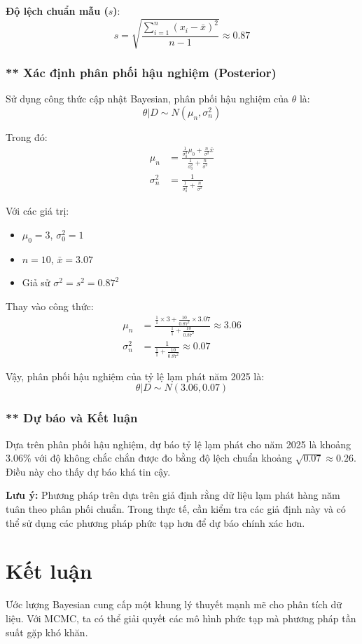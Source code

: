 \textbf{Độ lệch chuẩn mẫu ($s$)}:
\begin{equation}
    s = \sqrt{\frac{\sum_{i=1}^{n} (x_i - \bar{x})^2}{n-1}} \approx 0.87
\end{equation}

\subsubsection{** Xác định phân phối hậu nghiệm (Posterior)}
Sử dụng công thức cập nhật Bayesian, phân phối hậu nghiệm của $\theta$ là:
\begin{equation}
    \theta | D \sim N(\mu_n, \sigma_n^2)
\end{equation}

Trong đó:
\begin{align}
    \mu_n &= \frac{\frac{1}{\sigma_0^2} \mu_0 + \frac{n}{\sigma^2} \bar{x}}{\frac{1}{\sigma_0^2} + \frac{n}{\sigma^2}} \\
    \sigma_n^2 &= \frac{1}{\frac{1}{\sigma_0^2} + \frac{n}{\sigma^2}}
\end{align}

Với các giá trị:
\begin{itemize}
    \item $\mu_0 = 3$, $\sigma_0^2 = 1$
    \item $n = 10$, $\bar{x} = 3.07$
    \item Giả sử $\sigma^2 = s^2 = 0.87^2$
\end{itemize}

Thay vào công thức:
\begin{align}
    \mu_n &= \frac{\frac{1}{1} \times 3 + \frac{10}{0.87^2} \times 3.07}{\frac{1}{1} + \frac{10}{0.87^2}} \approx 3.06 \\
    \sigma_n^2 &= \frac{1}{\frac{1}{1} + \frac{10}{0.87^2}} \approx 0.07
\end{align}

Vậy, phân phối hậu nghiệm của tỷ lệ lạm phát năm 2025 là:
\begin{equation}
    \theta | D \sim N(3.06, 0.07)
\end{equation}

\subsubsection{** Dự báo và Kết luận}
Dựa trên phân phối hậu nghiệm, dự báo tỷ lệ lạm phát cho năm 2025 là khoảng 3.06\% với độ không chắc chắn được đo bằng độ lệch chuẩn khoảng $\sqrt{0.07} \approx 0.26$. Điều này cho thấy dự báo khá tin cậy.

\textbf{Lưu ý:} Phương pháp trên dựa trên giả định rằng dữ liệu lạm phát hàng năm tuân theo phân phối chuẩn. Trong thực tế, cần kiểm tra các giả định này và có thể sử dụng các phương pháp phức tạp hơn để dự báo chính xác hơn.

\section{Kết luận}
Ước lượng Bayesian cung cấp một khung lý thuyết mạnh mẽ cho phân tích dữ liệu. Với MCMC, ta có thể giải quyết các mô hình phức tạp mà phương pháp tần suất gặp khó khăn.



